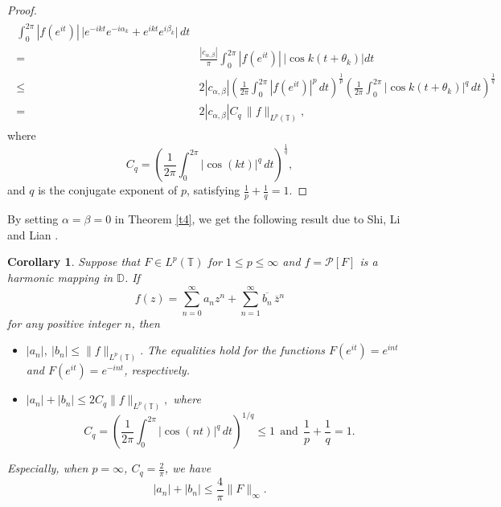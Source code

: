 \documentclass[11pt, reqno]{amsart}
\newtheorem{cor}{Corollary}
\theoremstyle{definition}
\numberwithin{equation}{section}
\newcommand{\abs}[1]{\left\vert#1\right\vert}
\theoremstyle{remark}
\numberwithin{equation}{section}
\begin{document}
\begin{proof}
\begin{align*}
\begin{split}
	\int_{0}^{2\pi}\abs{f\left(e^{it}\right)}\,\bigl|e^{-ikt}e^{-i\alpha_k}+e^{ikt}e^{i\beta_k}\bigr|\,dt
	\\=&\frac{|c_{\alpha,\beta}|}{\pi}\int_{0}^{2\pi}\abs{f\left(e^{it}\right)}\,\bigl|\cos k(t+\theta_k)\bigr|dt\\ \leq&
	2|c_{\alpha,\beta}|\left(\frac{1}{2\pi}\int_{0}^{2\pi}
	\abs{f\left(e^{it}\right)}^{p}\,dt\right)^{\frac{1}{p}}
	\left(\frac{1}{2\pi}\int_{0}^{2\pi}
	|\cos k(t+\theta_k)|^{q}\,dt\right)^{\frac{1}{q}}\\=&
	2|c_{\alpha,\beta}|C_q\,\|f\|_{L^p(\mathbb{T})} ,
    \end{split}
	\end{align*}
where
\[
C_q
=
\left(
\frac{1}{2\pi}
\int_{0}^{2\pi}
|\cos(kt)|^{q}\,dt
\right)^{\frac{1}{q}},
\]
and \(q\) is the conjugate exponent of \(p\), satisfying
\(\frac{1}{p}+\frac{1}{q}=1\).
\end{proof}

By setting $\alpha=\beta=0$ in Theorem \ref{t4}, we get the following result due to Shi, Li and Lian 
\cite[Theorem 2.1]{sll}.

\begin{cor}
Suppose that $F \in L^{p}(\mathbb{T})$ for $1 \le p \le \infty$ and
$f = \mathcal{P}[F]$ is a harmonic mapping in $\mathbb{D}$.
If
\[
f(z) = \sum_{n=0}^{\infty} a_n z^n + \sum_{n=1}^{\infty} \overline{b_n}\,\overline{z}^n
\]
for any positive integer $n$, then 
\begin{itemize}
\item[(i)]
		
$|a_n|,\ |b_n| \le \|f\|_{L^p(\mathbb{T})} .$ The equalities hold for the functions $F\left(e^{it}\right) = e^{int}$ and
$F\left(e^{it}\right) = e^{-int}$, respectively.
		
\item[(ii)]
$
|a_n| + |b_n| \le 2 C_q \|f\|_{L^p(\mathbb{T})} ,
$
where
\[
C_q = \left( \frac{1}{2\pi} \int_0^{2\pi} |\cos(nt)|^q \, dt \right)^{1/q} \le 1
\ \ \text{and} \ \ \frac{1}{p} + \frac{1}{q} = 1.
	\]
\end{itemize}
	Especially, when $p = \infty$, $C_q = \frac{2}{\pi}$, we have
\[
|a_n| + |b_n| \le \frac{4}{\pi} \|F\|_\infty.
\]
\end{cor}
\end{document}
